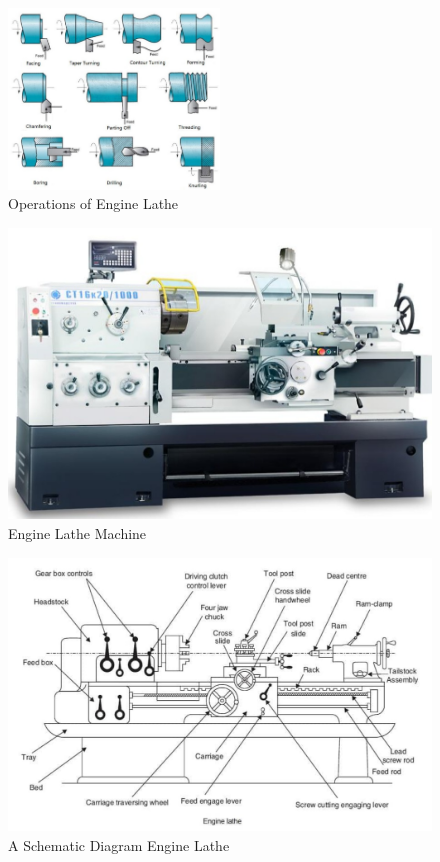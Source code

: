 \documentclass{article}
\begin{document}
\begin{figure}[htbp]
  \centering
  \includegraphics[width=0.5\textwidth]{img/operations.jpeg} 
  \caption{Operations of Engine Lathe} 
  \label{fig:operations}
\end{figure}

\begin{figure}[htbp]
  \centering
  \includegraphics[width=\textwidth]{img/engine_lathe.jpeg} 
  \caption{Engine Lathe Machine} 
  \label{fig:engine_lathe}
\end{figure}

\begin{figure}[htbp]
  \centering
  \includegraphics[width=\textwidth]{img/diagram.jpeg} 
  \caption{A Schematic Diagram Engine Lathe} 
  \label{fig:engine_lathe_diagram}
\end{figure}
\end{document}
